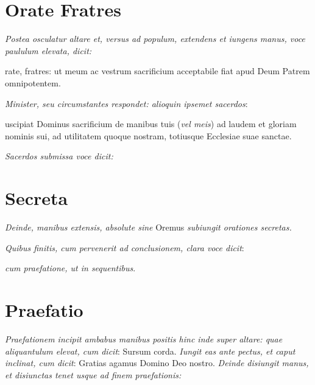 \section{Orate Fratres}

\textit{%
    Postea osculatur altare et, versus ad populum, extendens et iungens manus,
    voce paululum elevata, dicit:
}

rate, fratres: ut meum ac vestrum sacrificium acceptabile fiat apud
Deum Patrem omnipotentem.

\textit{Minister, seu circumstantes respondet: alioquin ipsemet sacerdos}:

uscipiat Dominus sacrificium de manibus tuis (\textit{vel meis}) ad
laudem et gloriam nominis sui, ad utilitatem quoque nostram, totiusque Ecclesiae
suae sanctae.

\textit{Sacerdos submissa voce dicit:}


\section{Secreta}

\textit{Deinde, manibus extensis, absolute sine} Oremus \textit{subiungit
orationes secretas.}


\textit{Quibus finitis, cum pervenerit ad conclusionem, clara voce dicit}:


\textit{cum praefatione, ut in sequentibus}.

\section{Praefatio}


\textit{Praefationem incipit ambabus manibus positis hinc inde super altare:
quae aliquantulum elevat, cum dicit}: Sursum corda.  \textit{Iungit eas ante
pectus, et caput inclinat, cum dicit}: Gratias agamus Domino Deo nostro.
\textit{Deinde disiungit manus, et disiunctas tenet usque ad finem
praefationis:}


